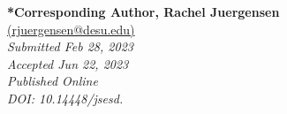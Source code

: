 \documentclass[11.5pt]{sig-alternate}
\begin{document}



\textbf{*Corresponding Author, Rachel Juergensen}\\
\href{mailto:rjuergensen@desu.edu}{(rjuergensen@desu.edu)} \\
\textit{Submitted Feb 28, 2023}\\
\textit{Accepted Jun 22, 2023} \\
\textit{Published Online } \\
\textit{DOI: 10.14448/jsesd.} \\

\pagebreak
\pagebreak

\vspace{5mm}
\section*{\vspace{140mm}}
\end{document}
